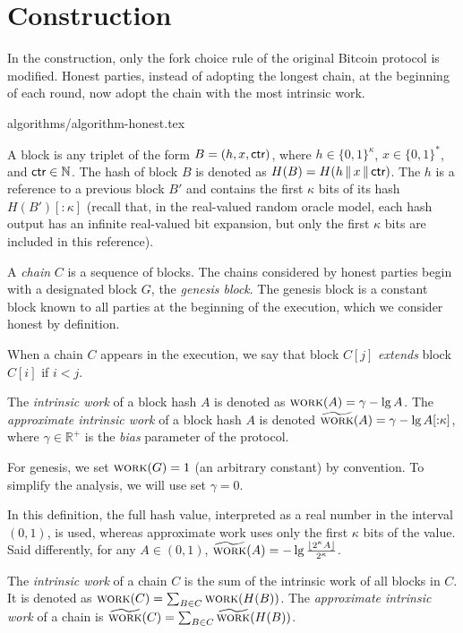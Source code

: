 \section{Construction}\label{sec:construction}
In the \poem construction, only the fork choice rule
of the original Bitcoin protocol is modified.
Honest parties, instead of adopting the longest chain, at the beginning
of each round, now adopt the chain with the most intrinsic work.

{algorithms/algorithm-honest.tex}

A block is any triplet of the
form $B = (h, x, \textsf{ctr})$, where $h \in \{0,1\}^\kappa$, $x \in \{0, 1\}^*$, and $\textsf{ctr} \in \mathbb{N}$.
The hash of block $B$ is denoted as $H(B) = H(h \,\|\, x \,\|\, \textsf{ctr})$.
The $h$ is a reference to a previous block $B'$ and
contains the first $\kappa$ bits of its hash $H(B')[{:}{\kappa}]$
(recall that, in the real-valued random oracle model, each hash
output has an infinite real-valued bit expansion, but only the first
$\kappa$ bits are included in this reference).

A \emph{chain} $C$ is a sequence of blocks. The chains considered by honest
parties begin with a designated
block $G$, the \emph{genesis block}. The genesis block is a constant block
known to all parties at the beginning of the execution,
which we consider honest by definition.

When a chain $C$ appears in the execution,
we say that block $C[j]$ \emph{extends} block $C[i]$ if $i < j$.

\begin{definition}
  The \emph{intrinsic work} of a block hash
  $A$ is denoted as $\textsc{work}(A) = \gamma - \lg A$.
  The \emph{approximate intrinsic work} of a block hash $A$ is denoted
  $\widetilde{\textsc{work}}(A) = \gamma - \lg A[{:}{\kappa}]$, where $\gamma \in \mathbb{R}^+$
  is the \emph{bias} parameter of the protocol.
\end{definition}

For genesis, we set $\textsc{work}(G) = 1$ (an arbitrary constant) by convention.
To simplify the analysis, we will use set $\gamma = 0$.

In this definition, the full hash value, interpreted as a real number in the interval
$(0, 1)$, is used, whereas approximate work uses only the first $\kappa$ bits of the
value. Said differently, for any $A \in (0, 1)$,
$\widetilde{\textsc{work}}(A) = -\lg \frac{\lfloor 2^\kappa A \rfloor}{2^\kappa}$.

\begin{definition}
  The \emph{intrinsic work} of a chain
  $C$ is the sum of the
  intrinsic work of all blocks in $C$.
  It is denoted as $\textsc{work}(C) = \sum_{B \in C}{\textsc{work}(H(B))}$.
  The \emph{approximate intrinsic work} of a chain
  is $\widetilde{\textsc{work}}(C) = \sum_{B \in C}{\widetilde{\textsc{work}}(H(B))}$.
\end{definition}

